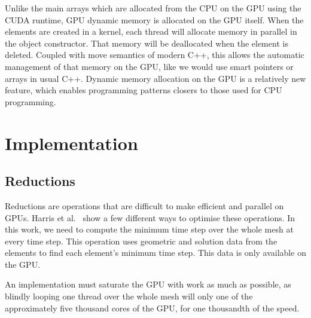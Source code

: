 Unlike the main arrays which are allocated from the CPU on the GPU using the CUDA runtime, GPU
dynamic memory is allocated on the GPU itself. When the elements are created in a kernel, each
thread will allocate memory in parallel in the object constructor. That memory will be deallocated
when the element is deleted. Coupled with move semantics of modern C++, this allows the automatic
management of that memory on the GPU, like we would use smart pointers or arrays in usual C++.
Dynamic memory allocation on the GPU is a relatively new feature, which enables programming patterns
closers to those used for CPU programming.

\section{Implementation} \label{section:graphics_processing_units:implementation}

\subsection{Reductions} \label{section:graphics_processing_units:implementation:reductions}

Reductions are operations that are difficult to make efficient and parallel on GPUs. Harris et
al.~\cite{Harris2007} show a few different ways to optimise these operations. In this work, we need
to compute the minimum time step over the whole mesh at every time step. This operation uses
geometric and solution data from the elements to find each element's minimum time step. This data is
only available on the GPU. 

An implementation must saturate the GPU with work as much as possible, as blindly looping one thread
over the whole mesh will only one of the approximately five thousand cores of the GPU, for one
thousandth of the speed. 